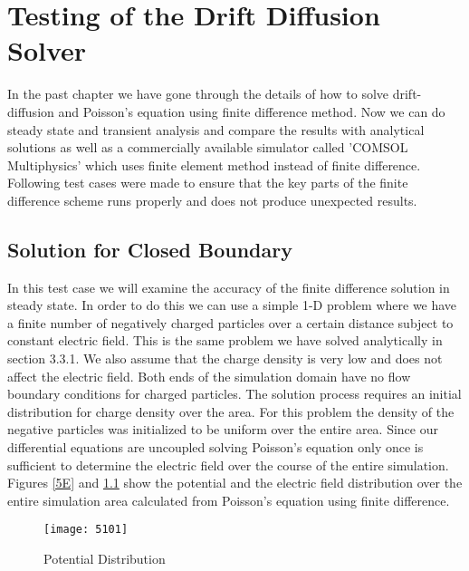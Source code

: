 
\chapter{Testing of the Drift Diffusion Solver} %

\label{Chapter4} %


In the past chapter we have gone through the details of how to solve drift-diffusion and Poisson's equation using finite difference method. Now we can do steady state and transient analysis and compare the results with analytical solutions as well as a commercially available simulator called 'COMSOL Multiphysics' which uses finite element method instead of finite difference. Following test cases were made to ensure that the key parts of the finite difference scheme runs properly and does not produce unexpected results. 

\section{Solution for Closed Boundary}
In this test case we will examine the accuracy of the finite difference solution in steady state. In order to do this we can use a simple 1-D problem where we have a finite number of negatively charged particles over a certain distance subject to constant electric field. This is the same problem we have solved analytically in section 3.3.1. We also assume that the charge density is very low and does not affect the electric field. Both ends of the simulation domain have no flow boundary conditions for charged particles. The solution process requires an initial distribution for charge density over the area. For this problem the density of the negative particles was initialized to be uniform over the entire area. Since our differential equations are uncoupled solving Poisson's equation only once is sufficient to determine the electric field over the course of the entire simulation. Figures \ref{5E} and \ref{5pot} show the potential and the electric field distribution over the entire simulation area calculated from Poisson's equation using finite difference. 

\begin{figure}
\centering
\texttt{[image: 5101]}
\caption{Potential Distribution} 
\label{5pot}
\end{figure}

